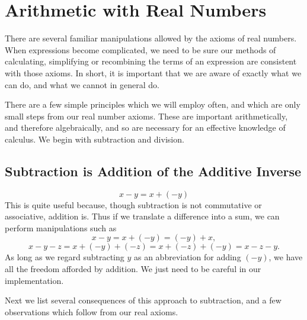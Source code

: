 \section{Arithmetic with Real Numbers\label{ArithmeticWithRealNumbers}}
There are several familiar manipulations allowed by the
axioms of real numbers.  When expressions become complicated,
we need to be sure our methods of 
calculating,  simplifying or recombining
the terms of an expression are consistent with those axioms.  
In short,
it is important that we are aware of exactly what we
can do, and what we cannot in general do.

There are a few simple principles which we will employ
often, and which are only small steps from our real
number axioms.  These are important arithmetically,
and therefore algebraically, and so are  necessary
for an effective knowledge of calculus.  We begin
with subtraction and division.

\subsection{Subtraction is Addition of the Additive Inverse
\label{SubsectionOnSubtraction}}

%
\begin{equation}
x-y=x+(-y)\label{SubtractionIsAddingAdditiveInverse}\end{equation}
This is quite useful because, though subtraction is
not  commutative or associative,\footnotemark
addition is.
\hphantom{. }%
Thus if we translate a difference into a 
sum, we can perform manipulations such as
$$x-y=x+(-y)=(-y)+x,$$
$$x-y-z=x+(-y)+(-z)=x+(-z)+(-y)=x-z-y.$$
As long as we regard subtracting $y$ as an abbreviation
for adding  $(-y)$,
we have all the freedom afforded by addition.  We just
need to be careful in our implementation.  

Next we list several consequences of 
 this approach to subtraction, and a few observations
which follow from our real axioms.

